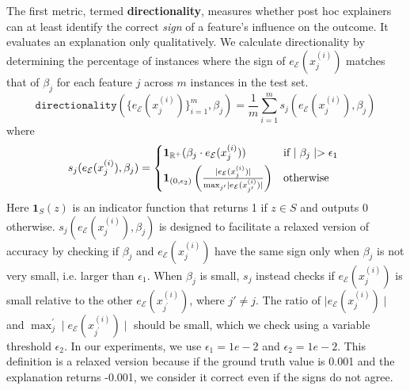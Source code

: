 \documentclass[mnsc,blindrev]{informs3}
\newcommand{\mE}{\mathcal{E}}
\begin{document}
    The first metric, termed \textbf{directionality}, measures whether post hoc explainers can at least identify the correct \textit{sign} of a feature's influence on the outcome. It evaluates an explanation only qualitatively. We calculate directionality by determining the percentage of instances where the sign of $e_\mE(x^{(i)}_j)$ matches that of $\beta_j$ for each feature $j$ across $m$ instances in the test set. %
    \begin{equation}
        \label{eq:acc}
        \texttt{directionality}(\{e_\mE(x^{(i)}_j)\}_{i=1}^m,\beta_j) = \frac{1}{m} \sum_{i=1}^m s_j( e_\mE(x^{(i)}_j),\beta_j)
    \end{equation}
    where 
    \begin{equation*}
        s_j(e_\mE(x^{(i)}_j),\beta_j) = \begin{cases*}
                    \mathbf{1}_{\mathbb{R}^+}(\beta_j \cdot e_\mE(x^{(i)}_j)) & if  $\mid \beta_j\mid > \epsilon_1$  \\
                     \mathbf{1}_{(0,\epsilon_2)}\left(\frac{\mid e_\mE(x^{(i)}_j)\mid }{\max_{j'} \mid e_\mE(x^{(i)}_{j'})\mid}\right) & otherwise
                 \end{cases*}
    \end{equation*}
    Here $\mathbf{1}_S(z)$ is an indicator function that returns 1 if $z\in S$ and outputs 0 otherwise. $s_j(e_\mE(x^{(i)}_j),\beta_j)$ is designed to facilitate a relaxed version of accuracy by checking if  $\beta_j$ and $e_\mE(x^{(i)}_j)$ have the same sign only when $\beta_j$ is not very small, i.e. larger than $\epsilon_1$. When $\beta_j$ is small, $s_j$ instead checks if $e_\mE(x^{(i)}_j)$ is small relative to the other $e_\mE(x^{(i)}_{j^{\prime}})$, where $j\prime \neq j$. The ratio of $\mid e_\mE(x^{(i)}_j)\mid $ and $\max_j^\prime \mid e_\mE(x^{(i)}_{j^\prime})\mid$ should be small, which we check using a variable threshold $\epsilon_2$. In our experiments, we use $\epsilon_1=1e-2$ and $\epsilon_2=1e-2$. This definition is a relaxed version because if the ground truth value is 0.001 and the explanation returns -0.001, we consider it correct even if the signs do not agree.
    
\end{document}
